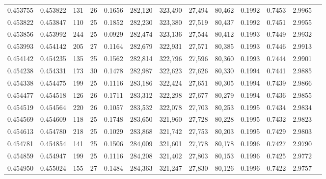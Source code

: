 \begin{tabular}{rrrrrrrrrrrrr}
0.453755 & 0.453822 & 131 &  26 &                                     0.1656 & 282,120 & 323,490 &  27,494 &  80,462 & 0.1992 & 0.7453 & 2.9965 \\
0.453822 & 0.453847 & 110 &  25 &                                     0.1852 & 282,230 & 323,380 &  27,519 &  80,437 & 0.1992 & 0.7451 & 2.9955 \\
0.453856 & 0.453992 & 244 &  25 &                                     0.0929 & 282,474 & 323,136 &  27,544 &  80,412 & 0.1993 & 0.7449 & 2.9932 \\
0.453993 & 0.454142 & 205 &  27 &                                     0.1164 & 282,679 & 322,931 &  27,571 &  80,385 & 0.1993 & 0.7446 & 2.9913 \\
0.454142 & 0.454235 & 135 &  25 &                                     0.1562 & 282,814 & 322,796 &  27,596 &  80,360 & 0.1993 & 0.7444 & 2.9901 \\
0.454238 & 0.454331 & 173 &  30 &                                     0.1478 & 282,987 & 322,623 &  27,626 &  80,330 & 0.1994 & 0.7441 & 2.9885 \\
0.454338 & 0.454475 & 199 &  25 &                                     0.1116 & 283,186 & 322,424 &  27,651 &  80,305 & 0.1994 & 0.7439 & 2.9866 \\
0.454477 & 0.454518 & 126 &  26 &                                     0.1711 & 283,312 & 322,298 &  27,677 &  80,279 & 0.1994 & 0.7436 & 2.9855 \\
0.454519 & 0.454564 & 220 &  26 &                                     0.1057 & 283,532 & 322,078 &  27,703 &  80,253 & 0.1995 & 0.7434 & 2.9834 \\
0.454569 & 0.454609 & 118 &  25 &                                     0.1748 & 283,650 & 321,960 &  27,728 &  80,228 & 0.1995 & 0.7432 & 2.9823 \\
0.454613 & 0.454780 & 218 &  25 &                                     0.1029 & 283,868 & 321,742 &  27,753 &  80,203 & 0.1995 & 0.7429 & 2.9803 \\
0.454781 & 0.454854 & 141 &  25 &                                     0.1506 & 284,009 & 321,601 &  27,778 &  80,178 & 0.1996 & 0.7427 & 2.9790 \\
0.454859 & 0.454947 & 199 &  25 &                                     0.1116 & 284,208 & 321,402 &  27,803 &  80,153 & 0.1996 & 0.7425 & 2.9772 \\
0.454950 & 0.455024 & 155 &  27 &                                     0.1484 & 284,363 & 321,247 &  27,830 &  80,126 & 0.1996 & 0.7422 & 2.9757 \\

\end{tabular}

